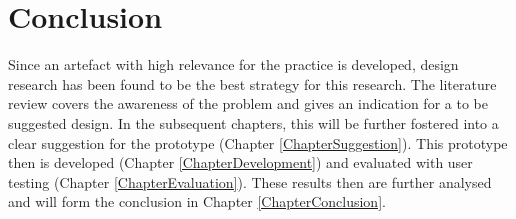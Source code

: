 



\section{Conclusion}

Since an artefact with high relevance for the practice is developed, design research has been found to be the best strategy for this research. The literature review covers the awareness of the problem and gives an indication for a to be suggested design. In the subsequent chapters, this will be further fostered into a clear suggestion for the prototype (Chapter \ref{ChapterSuggestion}). This prototype then is developed (Chapter \ref{ChapterDevelopment}) and evaluated with user testing (Chapter \ref{ChapterEvaluation}). These results then are further analysed and will form the conclusion in Chapter \ref{ChapterConclusion}.
